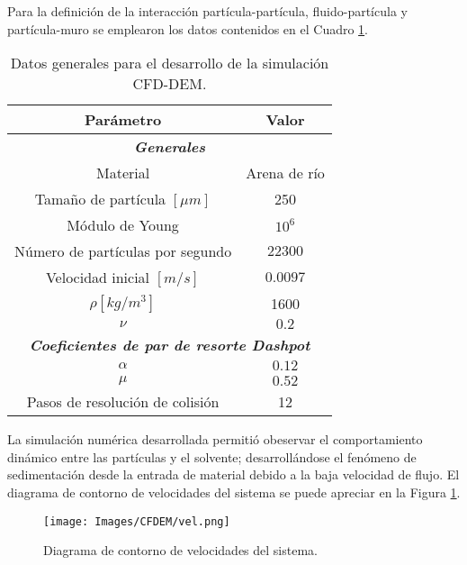\noindent
\justify

Para la definici\'on de la interacci\'on part\'icula-part\'icula, fluido-part\'icula y part\'icula-muro se emplearon los datos contenidos en el Cuadro \ref{CFDEMdata}.

\begin{table}[h!]
	\centering
	\begin{adjustbox}{max width = 0.45\textwidth}
	\begin{tabular}{|c|c|}
		\hline
		\textbf{Par\'ametro} & \textbf{Valor} \\ \hline
		\multicolumn{2}{|c|}{\textbf{\textit{Generales}}} \\ \hline
		Material & Arena de r\'io \\ \hline
		Tama\~no de part\'icula $[\mu m]$ & 250 \\ \hline
		M\'odulo de Young & $10 ^6$ \\ \hline
		 N\'umero de part\'iculas por segundo & $22300$ \\
		  \hline
		 Velocidad inicial $[m / s]$ & $0.0097$ \\ \hline
		 $\rho [kg/m^3]$ & 1600 \\ \hline
		 $\nu$ & $0.2$ \\ \hline
		 \multicolumn{2}{|c|}{\textbf{\textit{Coeficientes de par de resorte Dashpot}}} \\ \hline
		 $\alpha$ & $0.12$ \\ \hline
		 $\mu$ & $0.52$ \\ \hline
		 Pasos de resoluci\'on de colisi\'on & 12 \\ \hline
	\end{tabular}
	\end{adjustbox}
	\caption{Datos generales para el desarrollo de la simulaci\'on CFD-DEM.}
	\label{CFDEMdata}
\end{table}

\vspace{-0.8cm}

\noindent
\justify

La simulaci\'on num\'erica desarrollada permiti\'o obeservar el comportamiento din\'amico entre las part\'iculas y el solvente; desarroll\'andose el fen\'omeno de sedimentaci\'on desde la entrada de material debido a la baja velocidad de flujo. El diagrama de contorno de velocidades del sistema se puede apreciar en la Figura \ref{CFDEM:vel}.

\begin{figure}[h!]
	\centering
	\texttt{[image: Images/CFDEM/vel.png]}
	\caption{Diagrama de contorno de velocidades del sistema.}
	\label{CFDEM:vel}
\end{figure}

